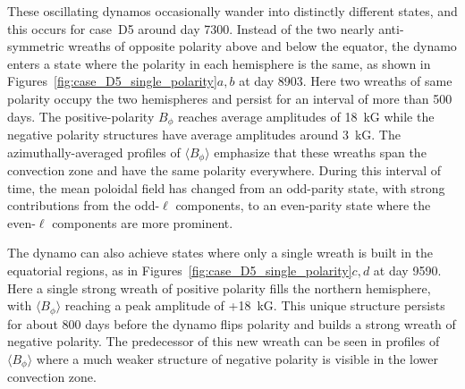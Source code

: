 These oscillating dynamos occasionally wander into distinctly
different states, and this occurs for case~D5 around day 7300.
Instead of the two nearly anti-symmetric wreaths of opposite polarity
above and below the equator, the dynamo enters a state where the
polarity in each hemisphere is the same, as shown in
Figures~\ref{fig:case_D5_single_polarity}$a,b$ at day 8903.  Here two
wreaths of same polarity occupy the two hemispheres and persist for
an interval of more than 500 days.  The positive-polarity $B_\phi$
reaches average amplitudes of 18~kG while the negative polarity
structures have average amplitudes around 3~kG.  The
azimuthally-averaged profiles of $\langle B_\phi \rangle$ emphasize
that these wreaths span the convection zone and have the same
polarity everywhere.  During this interval of time, the mean poloidal
field has changed from an odd-parity state, with strong contributions
from the odd-$\ell$ components, to an even-parity state where the
even-$\ell$ components are more prominent.

The dynamo can also achieve states where only a single wreath
is built in the equatorial regions, as in
Figures~\ref{fig:case_D5_single_polarity}$c,d$ at day 9590.  Here a
single strong wreath of positive polarity fills the northern
hemisphere, with $\langle B_\phi \rangle$ reaching a peak amplitude of
+18~kG.
This unique structure persists for about 800 days before
the dynamo flips polarity and builds a strong wreath of negative
polarity.  The predecessor of this new wreath can be seen in  
profiles of $\langle B_\phi \rangle$ where a much weaker
structure of negative polarity is visible in the lower convection zone.

